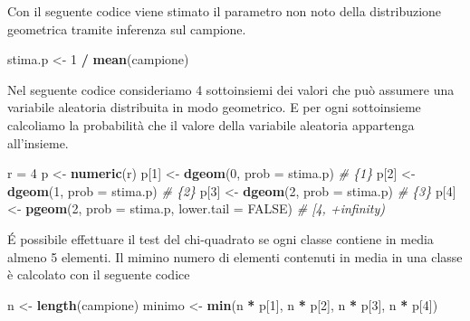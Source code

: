 \documentclass[]{book}
\newenvironment{Shaded}{\begin{snugshade}}{\end{snugshade}}
\newcommand{\KeywordTok}[1]{\textcolor[rgb]{0.13,0.29,0.53}{\textbf{#1}}}
\newcommand{\DataTypeTok}[1]{\textcolor[rgb]{0.13,0.29,0.53}{#1}}
\newcommand{\DecValTok}[1]{\textcolor[rgb]{0.00,0.00,0.81}{#1}}
\newcommand{\StringTok}[1]{\textcolor[rgb]{0.31,0.60,0.02}{#1}}
\newcommand{\CommentTok}[1]{\textcolor[rgb]{0.56,0.35,0.01}{\textit{#1}}}
\newcommand{\OtherTok}[1]{\textcolor[rgb]{0.56,0.35,0.01}{#1}}
\newcommand{\OperatorTok}[1]{\textcolor[rgb]{0.81,0.36,0.00}{\textbf{#1}}}
\newcommand{\NormalTok}[1]{#1}
\begin{document}
Con il seguente codice viene stimato il parametro non noto della
distribuzione geometrica tramite inferenza sul campione.

\begin{Shaded}
\begin{Highlighting}[]
\NormalTok{stima.p <-}\StringTok{ }\DecValTok{1} \OperatorTok{/}\StringTok{ }\KeywordTok{mean}\NormalTok{(campione) }
\end{Highlighting}
\end{Shaded}

Nel seguente codice consideriamo 4 sottoinsiemi dei valori che può
assumere una variabile aleatoria distribuita in modo geometrico. E per
ogni sottoinsieme calcoliamo la probabilità che il valore della
variabile aleatoria appartenga all'insieme.

\begin{Shaded}
\begin{Highlighting}[]
\NormalTok{r =}\StringTok{ }\DecValTok{4}
\NormalTok{p <-}\StringTok{ }\KeywordTok{numeric}\NormalTok{(r)}
\NormalTok{p[}\DecValTok{1}\NormalTok{] <-}\StringTok{ }\KeywordTok{dgeom}\NormalTok{(}\DecValTok{0}\NormalTok{, }\DataTypeTok{prob =}\NormalTok{ stima.p) }\CommentTok{# \{1\}}
\NormalTok{p[}\DecValTok{2}\NormalTok{] <-}\StringTok{ }\KeywordTok{dgeom}\NormalTok{(}\DecValTok{1}\NormalTok{, }\DataTypeTok{prob =}\NormalTok{ stima.p) }\CommentTok{# \{2\}}
\NormalTok{p[}\DecValTok{3}\NormalTok{] <-}\StringTok{ }\KeywordTok{dgeom}\NormalTok{(}\DecValTok{2}\NormalTok{, }\DataTypeTok{prob =}\NormalTok{ stima.p) }\CommentTok{# \{3\}}
\NormalTok{p[}\DecValTok{4}\NormalTok{] <-}\StringTok{ }\KeywordTok{pgeom}\NormalTok{(}\DecValTok{2}\NormalTok{, }\DataTypeTok{prob =}\NormalTok{ stima.p, }\DataTypeTok{lower.tail =} \OtherTok{FALSE}\NormalTok{) }\CommentTok{# [4, +infinity)}
\end{Highlighting}
\end{Shaded}

É possibile effettuare il test del chi-quadrato se ogni classe contiene
in media almeno 5 elementi. Il mimino numero di elementi contenuti in
media in una classe è calcolato con il seguente codice

\begin{Shaded}
\begin{Highlighting}[]
\NormalTok{n <-}\StringTok{ }\KeywordTok{length}\NormalTok{(campione)}
\NormalTok{minimo <-}\StringTok{ }\KeywordTok{min}\NormalTok{(n }\OperatorTok{*}\StringTok{ }\NormalTok{p[}\DecValTok{1}\NormalTok{], n }\OperatorTok{*}\StringTok{ }\NormalTok{p[}\DecValTok{2}\NormalTok{], n }\OperatorTok{*}\StringTok{ }\NormalTok{p[}\DecValTok{3}\NormalTok{], n }\OperatorTok{*}\StringTok{ }\NormalTok{p[}\DecValTok{4}\NormalTok{])}
\end{Highlighting}
\end{Shaded}
\end{document}
